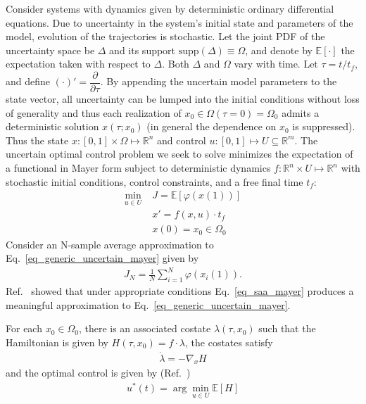 \documentclass[10pt,a4paper]{article}
\begin{document}
	Consider systems with dynamics given by deterministic ordinary differential equations. Due to uncertainty in the system's initial state and parameters of the model, evolution of the trajectories is stochastic. Let the joint PDF of the uncertainty space be $ \Delta $ and its support $\mathrm{supp}(\Delta)\equiv\Omega$, and denote by $\mathbb{E}[\cdot]$ the expectation taken with respect to $\Delta$. Both $\Delta$ and $\Omega$ vary with time. Let $\tau=t/t_f$, and define $(\cdot)'=\dfrac{\partial}{\partial\tau}$. By appending the uncertain model parameters to the state vector, all uncertainty can be lumped into the initial conditions without loss of generality and thus each realization of $x_0\in\Omega(\tau=0)=\Omega_0$ admits a deterministic solution $ x(\tau;x_0)$ (in general the dependence on $ x_0 $ is suppressed). Thus the state $x: [0,1]\times\Omega\mapsto\mathbb{R}^n$ and control $u: [0,1]\mapsto U\subseteq\mathbb{R}^m$. The uncertain optimal control problem we seek to solve minimizes the expectation of a functional in Mayer form subject to deterministic dynamics $f: \mathbb{R}^n \times U \mapsto \mathbb{R}^n$ with stochastic initial conditions, control constraints, and a free final time $t_f$:
	\begin{align}
	\min_{u\in U} \;&J = \mathbb{E}[\varphi(x(1))] \label{eq_generic_uncertain_mayer}  \\
		&x' = f(x,u)\cdot t_f \\
		&x(0)= x_0 \in \Omega_0 %
	\end{align}	
	Consider an N-sample average approximation to Eq.~\ref{eq_generic_uncertain_mayer} given by		
	\begin{align}
	J_N = \frac{1}{N}\sum_{i=1}^{N}\varphi(x_i(1)). \label{eq_saa_mayer}
	\end{align}	
	Ref.~\cite{UncertainOptimalControl} showed that under appropriate conditions Eq.~\ref{eq_saa_mayer} produces a meaningful approximation to Eq.~\ref{eq_generic_uncertain_mayer}. 
	
	For each $x_0 \in \Omega_0$, there is an associated costate $\lambda(\tau, x_0)$ such that the Hamiltonian is given by $H(\tau, x_0) = f\cdot\lambda$, the costates satisfy
	\begin{align}
	\dot{\lambda} = -\nabla_xH
	\end{align} 
	and the optimal control is given by (Ref.~\cite{RSOptimalControl})
	\begin{align}
	u^*(t) = \arg\min_{u\in U}\mathbb{E}[H] \label{eq_uncertain_optimal_control}
	\end{align}
	
\end{document}
